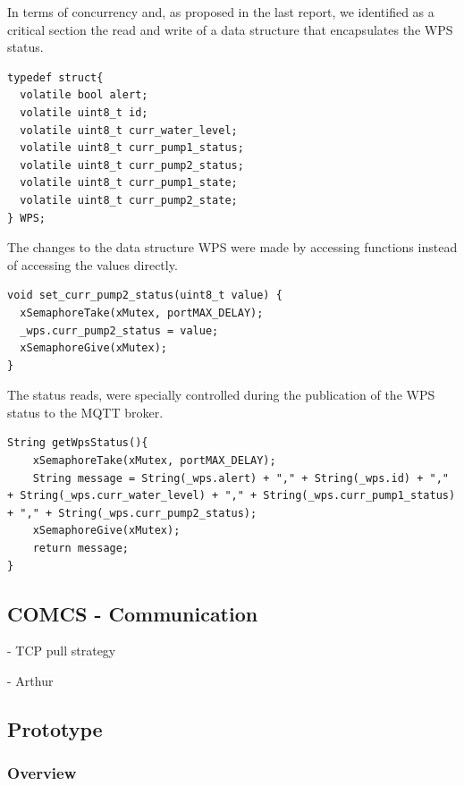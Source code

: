 \documentclass[11pt]{article}
\begin{document}
In terms of concurrency and, as proposed in the last report, we identified as a critical section the read and write of a data structure that encapsulates the WPS status.

\begin{verbatim}
typedef struct{
  volatile bool alert;
  volatile uint8_t id;
  volatile uint8_t curr_water_level;
  volatile uint8_t curr_pump1_status;
  volatile uint8_t curr_pump2_status;  
  volatile uint8_t curr_pump1_state;
  volatile uint8_t curr_pump2_state;
} WPS;
\end{verbatim}

The changes to the data structure WPS were made by accessing functions instead of accessing the values directly.

\begin{verbatim}
void set_curr_pump2_status(uint8_t value) {
  xSemaphoreTake(xMutex, portMAX_DELAY);
  _wps.curr_pump2_status = value;
  xSemaphoreGive(xMutex);
}
\end{verbatim}

The status reads, were specially controlled during the publication of the WPS status to the MQTT broker.

\begin{verbatim}
String getWpsStatus(){
    xSemaphoreTake(xMutex, portMAX_DELAY);
    String message = String(_wps.alert) + "," + String(_wps.id) + "," + String(_wps.curr_water_level) + "," + String(_wps.curr_pump1_status) + "," + String(_wps.curr_pump2_status);
    xSemaphoreGive(xMutex);
    return message;
}
\end{verbatim}

\subsection{COMCS - Communication}

- TCP pull strategy

- Arthur

\subsection{Prototype}

\subsubsection{Overview}
\end{document}

